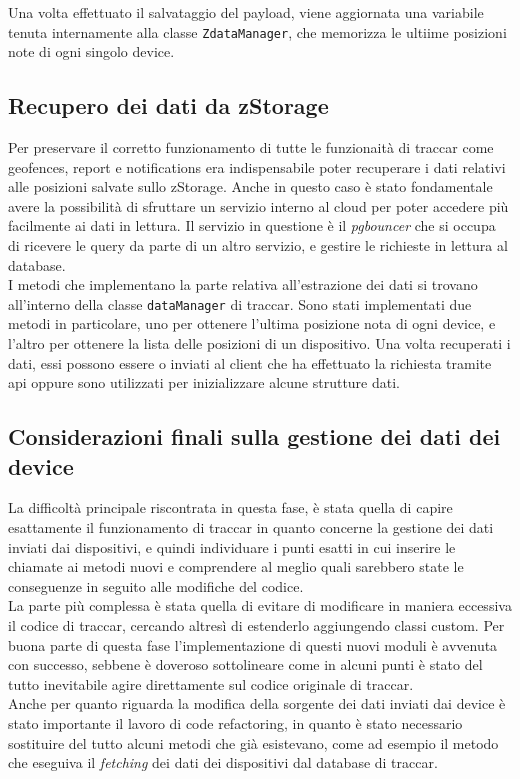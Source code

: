 \documentclass[a4paper,titlepage,12pt]{book}
\begin{document}
\noindent Una volta effettuato il salvataggio del payload, viene aggiornata una variabile tenuta internamente alla classe \texttt{ZdataManager}, che memorizza le ultiime posizioni note di ogni singolo device.

\subsection{\sffamily
Recupero dei dati da zStorage}
Per preservare il corretto funzionamento di tutte le funzionaità di traccar come geofences, report e notifications era indispensabile poter recuperare i dati relativi alle posizioni salvate sullo zStorage. Anche in questo caso è stato fondamentale avere la possibilità di sfruttare un servizio interno al cloud per poter accedere più facilmente ai dati in lettura. Il servizio in questione è il \textit{pgbouncer} che si occupa di ricevere le query da parte di un altro servizio, e gestire le richieste in lettura al database. \\
I metodi che implementano la parte relativa all'estrazione dei dati si trovano all'interno della classe \texttt{dataManager} di traccar. Sono stati implementati due metodi in particolare, uno per ottenere l'ultima posizione nota di ogni device, e l'altro per ottenere la lista delle posizioni di un dispositivo. Una volta recuperati i dati, essi possono essere o inviati al client che ha effettuato la richiesta tramite api oppure sono utilizzati per inizializzare alcune strutture dati.

\subsection{\sffamily
Considerazioni finali sulla gestione dei dati dei device}
La difficoltà principale riscontrata in questa fase, è stata quella di capire esattamente il funzionamento di traccar in quanto concerne la gestione dei dati inviati dai dispositivi, e quindi individuare i punti esatti in cui inserire le chiamate ai metodi nuovi e comprendere al meglio quali sarebbero state le conseguenze in seguito alle modifiche del codice.\\
 La parte più complessa è stata quella di evitare di modificare in maniera eccessiva il codice di traccar, cercando altresì di estenderlo aggiungendo classi custom. Per buona parte di questa fase l'implementazione di questi nuovi moduli è avvenuta con successo, sebbene è doveroso sottolineare come in alcuni punti è stato del tutto inevitabile agire direttamente sul codice originale di traccar.\\
Anche per quanto riguarda la modifica della sorgente dei dati inviati dai device è stato importante il lavoro di code refactoring, in quanto è stato necessario sostituire del tutto alcuni metodi che già esistevano, come ad esempio il metodo che eseguiva il \textit{fetching} dei dati dei dispositivi dal database di traccar.
\end{document}
